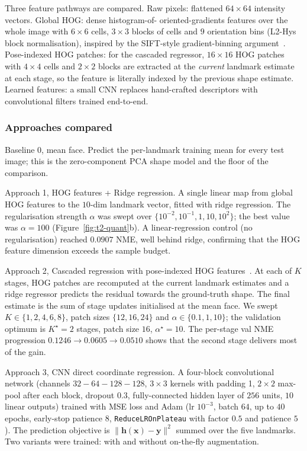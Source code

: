 \documentclass[11pt,a4paper]{article}
\begin{document}
Three feature pathways are compared. Raw pixels: flattened
\(64\times64\) intensity vectors. Global HOG: dense histogram-of-
oriented-gradients features over the whole image with
\(6\times6\) cells, \(3\times3\) blocks of cells and \(9\) orientation
bins (L2-Hys block normalisation), inspired by the SIFT-style
gradient-binning argument~\cite{lowe2004sift}. Pose-indexed HOG
patches: for the cascaded regressor, \(16\times16\) HOG patches with
\(4\times4\) cells and \(2\times2\) blocks are extracted at the
\emph{current} landmark estimate at each stage, so the feature is
literally indexed by the previous shape estimate.
Learned features: a small CNN replaces hand-crafted descriptors
with convolutional filters trained end-to-end.

\subsubsection{Approaches compared}

Baseline 0, mean face. Predict the per-landmark training
mean for every test image; this is the zero-component PCA shape model
and the floor of the comparison.

Approach 1, HOG features + Ridge regression. A single linear
map from global HOG features to the \(10\)-dim landmark vector, fitted
with ridge regression. The regularisation strength \(\alpha\) was swept
over \(\{10^{-2},10^{-1},1,10,10^2\}\); the best value was
\(\alpha=100\) (Figure~\ref{fig:t2-quant}b). A linear-regression
control (no regularisation) reached \(0.0907\) NME, well behind ridge,
confirming that the HOG feature dimension exceeds the sample budget.

Approach 2, Cascaded regression with pose-indexed HOG
features~\cite{cao2014esr,xiong2013sdm}. At each of \(K\) stages, HOG
patches are recomputed at the current landmark estimates and a ridge
regressor predicts the residual towards the ground-truth shape. The
final estimate is the sum of stage updates initialised at the mean
face. We swept \(K\in\{1,2,4,6,8\}\), patch sizes
\(\{12,16,24\}\) and \(\alpha\in\{0.1,1,10\}\); the validation
optimum is \(K^\star=2\) stages, patch size \(16\), \(\alpha^\star=10\).
The per-stage val NME progression \(0.1246\to0.0605\to0.0510\) shows
that the second stage delivers most of the gain.

Approach 3, CNN direct coordinate regression. A four-block
convolutional network (channels \(32{-}64{-}128{-}128\), \(3\times3\)
kernels with padding 1, \(2\times2\) max-pool after each block, dropout
\(0.3\), fully-connected hidden layer of \(256\) units, \(10\) linear
outputs) trained with MSE loss and Adam (lr \(10^{-3}\), batch \(64\),
up to \(40\) epochs, early-stop patience \(8\),
\texttt{ReduceLROnPlateau} with factor \(0.5\) and patience \(5\)). The
prediction objective is
\(\|\bm{h}(\bm{x})-\bm{y}\|^2\) summed over the five landmarks.
Two variants were trained: with and without on-the-fly augmentation.
\end{document}
